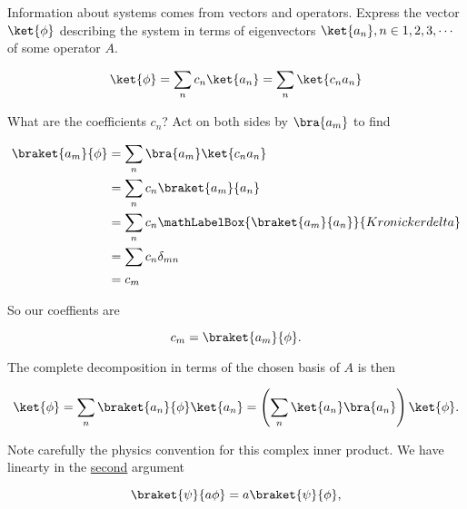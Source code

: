 %
%
%

Information about systems comes from vectors and operators.  Express the vector $\ket{\phi}$ describing the system in terms of eigenvectors $\ket{a_n}, n \in 1,2,3,\cdots$ of some operator $A$.

\begin{equation}\label{eqn:PHY356FLecture10:51}
\ket{\phi} = \sum_n c_n \ket{a_n} = \sum_n \ket{c_n a_n}
\end{equation}

What are the coefficients $c_n$?  Act on both sides by $\bra{a_m}$ to find

\begin{equation}\label{eqn:lecture5BigReviewCh1Formalism:71}
\begin{aligned}
\braket{a_m}{\phi}
&= \sum_n \bra{a_m} \ket{ c_n a_n } \\
&= \sum_n c_n \braket{a_m}{ a_n } \\
&= \sum_n c_n 
\mathLabelBox{\braket{a_m}{a_n}}{Kronicker delta}
\\
&= \sum c_n \delta_{mn} \\
&= c_m
\end{aligned}
\end{equation}

So our coeffients are

\begin{equation}\label{eqn:PHY356FLecture10:51c}
c_m = \braket{a_m}{\phi}.
\end{equation}

The complete decomposition in terms of the chosen basis of $A$ is then

\begin{equation}\label{eqn:PHY356FLecture10:51b}
\ket{\phi} = \sum_n \braket{a_n}{\phi} \ket{a_n}
= \left( \sum_n \ket{a_n} \bra{a_n} \right) \ket{\phi}.
\end{equation}

Note carefully the physics convention for this complex inner product.  We have linearty in the \underline{second} argument

\begin{equation}\label{eqn:PHY356FLecture10:51e}
\braket{\psi}{a \phi} = a \braket{\psi}{\phi},
\end{equation}

